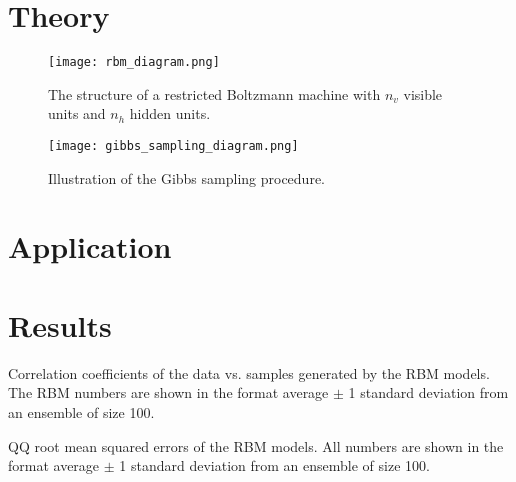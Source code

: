 \section{Theory}



\begin{figure}
    \begin{center}
        \texttt{[image: rbm\_diagram.png]}
    \end{center}
    \caption{The structure of a restricted Boltzmann machine with \( n_v \) visible units and \( n_h \) hidden units.}
    \label{fig:rbm_diagram}
\end{figure}

\begin{figure}
    \begin{center}
        \texttt{[image: gibbs\_sampling\_diagram.png]}
    \end{center}
    \caption{Illustration of the Gibbs sampling procedure.}
    \label{fig:gibbs_sampling_diagram}
\end{figure}

\section{Application}

\section{Results}
\begin{table}[ht]
    \centering
    \begin{adjustbox}{max width=\textwidth}
        
    \end{adjustbox}
    \caption{Correlation coefficients of the data vs. samples generated by the RBM models. The RBM numbers are shown in the format average \(\pm\) 1 standard deviation from an ensemble of size 100.}
    \label{tbl:rbm_correlation_coefficients}
\end{table}

\begin{table}[ht]
    \centering
    \begin{adjustbox}{max width=\textwidth}
        
    \end{adjustbox}
    \caption{QQ root mean squared errors of the RBM models. All numbers are shown in the format average \(\pm\) 1 standard deviation from an ensemble of size 100.}
    \label{tbl:rbm_qq_rmse}
\end{table}

